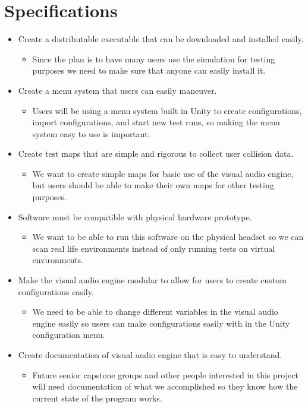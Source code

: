 \documentclass{scrreprt}
\begin{document}
\section{Specifications} 
\begin{itemize}
\item Create a distributable executable that can be downloaded and installed easily.
  \begin{itemize}
    \item Since the plan is to have many users use the simulation for testing purposes we need to make sure that anyone can easily install it.
  \end{itemize}
\item Create a menu system that users can easily maneuver.
  \begin{itemize}
    \item Users will be using a menu system built in Unity to create configurations, import configurations, and start new test runs, so making the menu system easy to use is important.
  \end{itemize}
\item Create test maps that are simple and rigorous to collect user collision data.
  \begin{itemize}
    \item We want to create simple maps for basic use of the visual audio engine, but users should be able to make their own maps for other testing purposes.
  \end{itemize}
\item Software must be compatible with physical hardware prototype.
  \begin{itemize}
    \item We want to be able to run this software on the physical headset so we can scan real life environments instead of only running tests on virtual environments.
  \end{itemize}
\item Make the visual audio engine modular to allow for users to create custom configurations easily.
\begin{itemize}
    \item We need to be able to change different variables in the visual audio engine easily so users can make configurations easily with in the Unity configuration menu.
  \end{itemize}
\item Create documentation of visual audio engine that is easy to understand.
  \begin{itemize}
    \item Future senior capstone groups and other people interested in this project will need documentation of what we accomplished so they know how the current state of the program works.
  \end{itemize}
\end{itemize}
\end{document}
